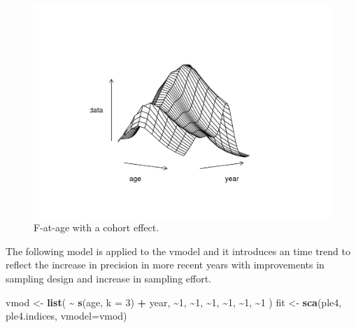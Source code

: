\documentclass[
]{book}
\newenvironment{Shaded}{\begin{snugshade}}{\end{snugshade}}
\newcommand{\AttributeTok}[1]{\textcolor[rgb]{0.13,0.29,0.53}{#1}}
\newcommand{\DecValTok}[1]{\textcolor[rgb]{0.00,0.00,0.81}{#1}}
\newcommand{\FunctionTok}[1]{\textcolor[rgb]{0.13,0.29,0.53}{\textbf{#1}}}
\newcommand{\NormalTok}[1]{#1}
\newcommand{\OtherTok}[1]{\textcolor[rgb]{0.56,0.35,0.01}{#1}}
\newcommand{\SpecialCharTok}[1]{\textcolor[rgb]{0.81,0.36,0.00}{\textbf{#1}}}
\begin{document}
\begin{figure}
\centering
\includegraphics{_bookdown_files/_main_files/figure-html/coh-1.png}
\caption{\label{fig:coh}F-at-age with a cohort effect.}
\end{figure}

The following model is applied to the vmodel and it introduces an time trend to reflect the increase in precision in more recent years with improvements in sampling design and increase in sampling effort.

\begin{Shaded}
\begin{Highlighting}[]
\NormalTok{vmod }\OtherTok{\textless{}{-}} \FunctionTok{list}\NormalTok{(}
       \SpecialCharTok{\textasciitilde{}} \FunctionTok{s}\NormalTok{(age, }\AttributeTok{k =} \DecValTok{3}\NormalTok{) }\SpecialCharTok{+}\NormalTok{ year,}
       \SpecialCharTok{\textasciitilde{}}\DecValTok{1}\NormalTok{, }\SpecialCharTok{\textasciitilde{}}\DecValTok{1}\NormalTok{, }\SpecialCharTok{\textasciitilde{}}\DecValTok{1}\NormalTok{, }\SpecialCharTok{\textasciitilde{}}\DecValTok{1}\NormalTok{, }\SpecialCharTok{\textasciitilde{}}\DecValTok{1}\NormalTok{, }\SpecialCharTok{\textasciitilde{}}\DecValTok{1}
\NormalTok{       )}
\NormalTok{fit }\OtherTok{\textless{}{-}} \FunctionTok{sca}\NormalTok{(ple4, ple4.indices, }\AttributeTok{vmodel=}\NormalTok{vmod)}
\end{Highlighting}
\end{Shaded}
\end{document}
